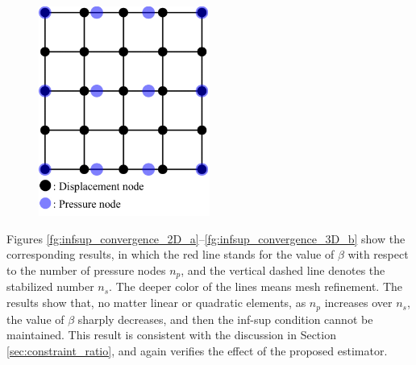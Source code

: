 \DIFaddbegin \begin{figure}[H]
\centering
\includegraphics[width=0.5\textwidth]{pdf/infsup_mesh.pdf}
\caption{}\label{fg:infsup_mesh}
\end{figure}

\DIFaddend Figures \ref{fg:infsup_convergence_2D_a}--\ref{fg:infsup_convergence_3D_b} show the corresponding results, in which the red line stands for the value of $\beta$ with respect to the number of pressure nodes $n_p$, and the vertical dashed line denotes the stabilized number $n_s$. The deeper color of the lines means mesh refinement. The results show that, no matter linear or quadratic elements, as $n_p$ increases over $n_s$, the value of $\beta$ sharply decreases, and then the inf-sup condition cannot be maintained. This result is consistent with the discussion in Section \ref{sec:constraint_ratio}, and again verifies the effect of the proposed estimator.

